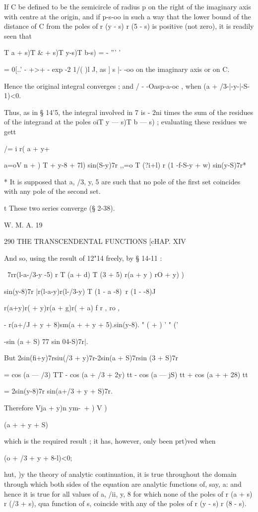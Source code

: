 If C be defined to be the semicircle of radius p on the right of the
imaginary axis with centre at the origin, and if p-s-oo in such a way
that the lower bound of the distance of C from the poles of r (y - s)
r (5 - s) is positive (not zero), it is readily seen that

T a + s)T \& + s)T y-s)T b-s) = - ''' '

= 0[..' - +>+ - exp -2 1/( )l J, as ] s |- -oo on the imaginary axis
or on C.

Hence the original integral converges ; and / - -Oasp-a-oc , when (a +
/3-|-y-|-S- 1)<0.

Thus, as in § 14'5, the integral involved in 7 is - 2ni times the sum
of the residues of the integrand at the poles oiT y — s)T b — s) ;
evaluating these residues we gett

/= i r( a + y+%

a=oV n + ) T + y-8 + 7l) sin(S-y)7r ,,=o T (?i+l) r (1 -f-S-y + w)
sin(y-S)7r*

* It is supposed that a, /3, y, 5 are such that no pole of the first
set coincides with any pole of the second set.

t These two series converge (§ 2-38).

W. M. A. 19

290 THE TRANSCENDENTAL FUNCTIONS [cHAP. XIV

And so, using the result of 12"14 freely, by § 14-11 :

\ 7rr(l-a-/3-y -5) r T (a + d) T (3 + 5) r(a + y ) rO + y) )

sin(y-8)7r |r(l-a-y)r(l-/3-y) T (1 - a -8)~r (1 - -8)J

r(a+y)r( + y)r(a + g)r( + a) f r , ro ,

- r(a+/J + y + 8)sm(a + + y + 5).sin(y-8). " ( + ) ' " ('

-sin (a + S) 77 sin 04-S)7r|.

But 2sin(fi+y)7rsiu(/3 + y)7r-2sin(a + S)7rsin (3 + S)7r

= cos (a — /3) TT - cos (a + /3 + 2y) tt - cos (a — jS) tt + cos (a +
+ 28) tt

= 2sin(y-8)7r sin(a+/3 + y + S)7r.

Therefore Vja + y)n ym-\ + ) V )

 (a + + y + S)

which is the required result ; it has, however, only been prt)ved when

 (o + /3 + y + 8-l)<0;

hut, )y the theory of analytic continuation, it is true throughout the
domain through which both sides of the equation are analytic functions
of, say, a: and hence it is true for all values of a, /ii, y, 8 for
which none of the poles of r (a + s) r (/3 + s), qua function of s,
coincide with any of the poles of r (y - s) r (8 - s).

